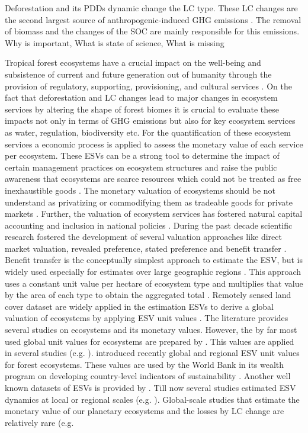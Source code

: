 	Deforestation and its \acp{PDD} dynamic change the \ac{LC} type. These \ac{LC} changes are the second largest source of anthropogenic-induced \ac{GHG} emissions \citep{Don2010}. The removal of biomass and the changes of the \ac{SOC} are mainly responsible for this emissions. Why is important, What is state of science, What is missing

	Tropical forest ecosystems have a crucial impact on the well-being and subsistence of current and future generation out of humanity through the provision of regulatory, supporting, provisioning, and cultural services \citep{Costanza1997}. On the fact that deforestation and \ac{LC} changes lead to major changes in ecosystem services by altering the shape of forest biomes it is crucial to evaluate these impacts not only in terms of \ac{GHG} emissions but also for key ecosystem services as water, regulation, biodiversity etc. For the quantification of these ecosystem services a economic process is applied to assess the monetary value of each service per ecosystem. These \acp{ESV} can be a strong tool to determine the impact of certain management practices on ecosystem structures and raise the public awareness that ecosystems are scarce resources which could not be treated as free inexhaustible goods \citep{Groot2012}. The monetary valuation of ecosystems should be not understand as privatizing or commodifying them as tradeable goods for private markets \citep{Costanza2014,Song2018}. Further, the valuation of ecosystem services has fostered natural capital accounting and inclusion in national policies \citep{Song2018}. During the past decade scientific research fostered the development of several valuation approaches like direct market valuation, revealed preference, stated preference and benefit transfer \citep{Song2018}. Benefit transfer is the conceptually simplest approach to estimate the \ac{ESV}, but is widely used especially for estimates over large geographic regions \citep{Costanza1997,Song2018,Costanza2014}. This approach uses a constant unit value per hectare of ecosystem type and multiplies that value by the area of each type to obtain the aggregated total \citep{Costanza2014}. Remotely sensed land cover dataset are widely applied in the estimation \acp{ESV} to derive a global valuation of ecosystems by applying \ac{ESV} unit values \citep{Song2018}. The literature provides several studies on ecosystems and its monetary values. However, the by far most used global unit values for ecosystems are prepared by \citeauthor{Costanza2014}. This values are applied in several studies (e.g. \citet{Costanza2014,Song2018,Sannigrahi2018,Kreuter2001,Wang2006,Zhao2004}). \citet{Siikamaki2015} introduced recently global and regional \ac{ESV} unit values for forest ecosystems. These values are used by the World Bank in its wealth program on developing country-level indicators of sustainability \citep{Siikamaki2015}. Another well known datasets of \acp{ESV} is provided by \citet{Groot2012}. Till now several studies estimated \ac{ESV} dynamics at local or regional scales (e.g. \citet{Kreuter2001,Wang2006,Zhao2004}). Global-scale studies that estimate the monetary value of our planetary ecosystems and the losses by \ac{LC} change are relatively rare (e.g. 